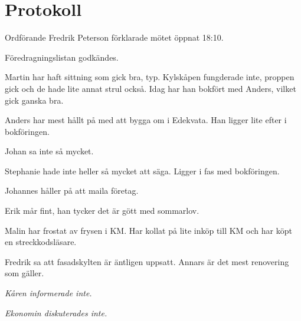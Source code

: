 \documentclass[10pt]{article}
\def\mo{Fredrik Peterson}
\begin{document}
\section*{Protokoll}
\begin{paragrafer}
Ordförande {\mo} förklarade mötet öppnat 18:10.

\valavmo

\valavms

\tosg

\ingaadj

\valavj

Föredragningslistan godkändes.


\begin{fyllnadsval} %
\end{fyllnadsval}

\begin{paragrafer}
Martin har haft sittning som gick bra, typ. Kylskåpen fungderade inte, proppen gick och de hade lite annat strul också. Idag har han bokfört med Anders, vilket gick ganska bra.

Anders har mest hållt på med att bygga om i Edekvata. Han ligger lite efter i bokföringen.

Johan sa inte så mycket.

Stephanie hade inte heller så mycket att säga. Ligger i fas med bokföringen.

Johannes håller på att maila företag.

Erik mår fint, han tycker det är gött med sommarlov.

Malin har frostat av frysen i KM. Har kollat på lite inköp till KM och har köpt en streckkodsläsare.

Fredrik sa att fasadskylten är äntligen uppsatt. Annars är det mest renovering som gäller.

\emph{Kåren informerade inte.}

\emph{Ekonomin diskuterades inte.}

\end{paragrafer}


\end{paragrafer}
\end{document}
